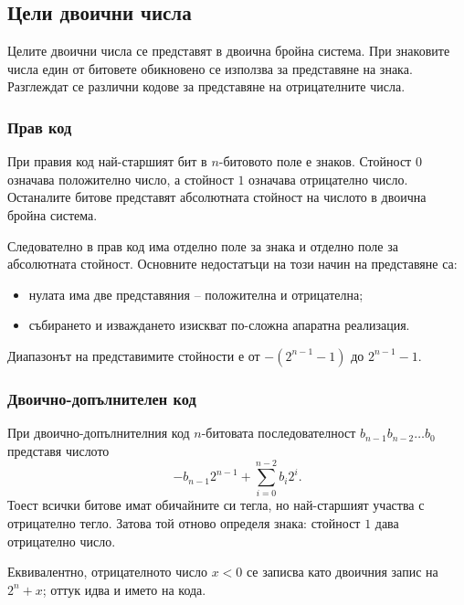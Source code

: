 \subsection{Цели двоични числа}\label{s:9.2.1}

Целите двоични числа се представят в двоична бройна система. При знаковите числа един от битовете обикновено се използва за представяне на знака. Разглеждат се различни кодове за представяне на отрицателните числа.

\subsubsection{Прав код}

\begin{defn}
При правия код най-старшият бит в $n$-битовото поле е знаков. Стойност $0$ означава положително число, а стойност $1$ означава отрицателно число. Останалите битове представят абсолютната стойност на числото в двоична бройна система.
\end{defn}

Следователно в прав код има отделно поле за знака и отделно поле за абсолютната стойност. Основните недостатъци на този начин на представяне са:

\begin{itemize}
    \item нулата има две представяния -- положителна и отрицателна;
    \item събирането и изваждането изискват по-сложна апаратна реализация.
\end{itemize}

Диапазонът на представимите стойности е от $-(2^{n-1}-1)$ до $2^{n-1}-1$.

\subsubsection{Двоично-допълнителен код}

\begin{defn}
При двоично-допълнителния код $n$-битовата последователност $b_{n-1}b_{n-2}\ldots b_0$ представя числото
\[
-b_{n-1}2^{n-1}+\sum_{i=0}^{n-2}b_i2^i .
\]
Тоест всички битове имат обичайните си тегла, но най-старшият участва с отрицателно тегло. Затова той отново определя знака: стойност $1$ дава отрицателно число.

Еквивалентно, отрицателното число $x<0$ се записва като двоичния запис на $2^n+x$; оттук идва и името на кода.
\end{defn}

